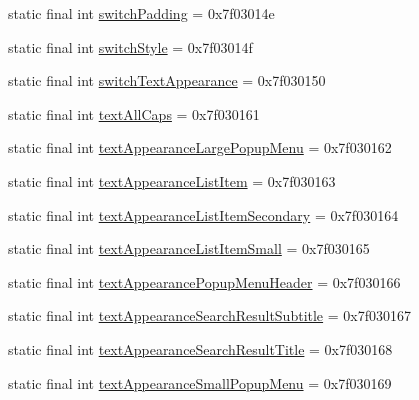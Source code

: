 \begin{DoxyCompactItemize}
\item 
static final int \mbox{\hyperlink{classandroid_1_1support_1_1v7_1_1appcompat_1_1R_1_1attr_a2b380e1b935b811ec822dbf4a4014d05}{switch\+Padding}} = 0x7f03014e
\item 
static final int \mbox{\hyperlink{classandroid_1_1support_1_1v7_1_1appcompat_1_1R_1_1attr_a5707a72d4574ca65a318099dd8101d59}{switch\+Style}} = 0x7f03014f
\item 
static final int \mbox{\hyperlink{classandroid_1_1support_1_1v7_1_1appcompat_1_1R_1_1attr_af5a40cefa1117378a67f11a74d605a6b}{switch\+Text\+Appearance}} = 0x7f030150
\item 
static final int \mbox{\hyperlink{classandroid_1_1support_1_1v7_1_1appcompat_1_1R_1_1attr_a4a60809d06170629404a0a766aad785e}{text\+All\+Caps}} = 0x7f030161
\item 
static final int \mbox{\hyperlink{classandroid_1_1support_1_1v7_1_1appcompat_1_1R_1_1attr_a74709df50c1106d494db194f4d3b6c0c}{text\+Appearance\+Large\+Popup\+Menu}} = 0x7f030162
\item 
static final int \mbox{\hyperlink{classandroid_1_1support_1_1v7_1_1appcompat_1_1R_1_1attr_ad63a659a75f2e87efb7d90fec4edd4b5}{text\+Appearance\+List\+Item}} = 0x7f030163
\item 
static final int \mbox{\hyperlink{classandroid_1_1support_1_1v7_1_1appcompat_1_1R_1_1attr_a8cbdd00a7bc7545250850d3d6a00f18e}{text\+Appearance\+List\+Item\+Secondary}} = 0x7f030164
\item 
static final int \mbox{\hyperlink{classandroid_1_1support_1_1v7_1_1appcompat_1_1R_1_1attr_abda379e68781ab8c707c66b040ac9a62}{text\+Appearance\+List\+Item\+Small}} = 0x7f030165
\item 
static final int \mbox{\hyperlink{classandroid_1_1support_1_1v7_1_1appcompat_1_1R_1_1attr_ae58c369de116e689fb7c5f730d34bcf5}{text\+Appearance\+Popup\+Menu\+Header}} = 0x7f030166
\item 
static final int \mbox{\hyperlink{classandroid_1_1support_1_1v7_1_1appcompat_1_1R_1_1attr_a2651df0f5401849b71cff71b656297fe}{text\+Appearance\+Search\+Result\+Subtitle}} = 0x7f030167
\item 
static final int \mbox{\hyperlink{classandroid_1_1support_1_1v7_1_1appcompat_1_1R_1_1attr_a910447f9a3116783170bf3da8baf3666}{text\+Appearance\+Search\+Result\+Title}} = 0x7f030168
\item 
static final int \mbox{\hyperlink{classandroid_1_1support_1_1v7_1_1appcompat_1_1R_1_1attr_aad4315d4193f9362eaea2020b29b265a}{text\+Appearance\+Small\+Popup\+Menu}} = 0x7f030169

\end{DoxyCompactItemize}
